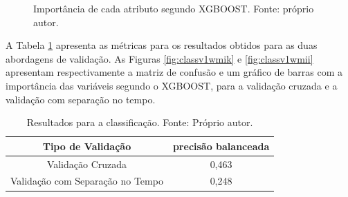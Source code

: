 \begin{figure}[H]
\center
{}
\caption{Importância de cada atributo segundo XGBOOST. Fonte: próprio autor.}\label{fig:regv1w}
\end{figure}

A Tabela \ref{tab:results_v1_w_class} apresenta as métricas para os resultados obtidos para as duas abordagens de validação. As Figuras \ref{fig:classv1wmik} e \ref{fig:classv1wmii} apresentam respectivamente a matriz de confusão e um gráfico de barras com a importância das variáveis segundo o XGBOOST, para a validação cruzada e a validação com separação no tempo.

\begin{table}[H]
\begin{center}
\begin{tabular}{|c|c|}
\hline
Tipo de Validação & precisão balanceada   \\ \hline
Validação Cruzada                   & 0,463    \\ \hline
Validação com Separação no Tempo    & 0,248     \\ \hline
\end{tabular}
\end{center}
\vspace{12pt}
\caption{Resultados para a classificação. Fonte: Próprio autor.}
\label{tab:results_v1_w_class}
\end{table}

